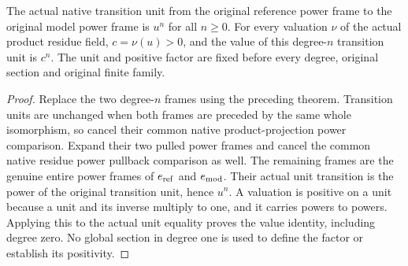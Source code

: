 \begin{theorem}\label{thm:native-tc-frame-transition-unit-powers}
\leanok
{}
The actual native transition unit from the original reference
power frame to the original model power frame is $u^n$ for all
$n\geq0$. For every valuation $\nu$ of the actual product residue
field, $c=\nu(u)>0$, and the value of this degree-$n$ transition
unit is $c^n$. The unit and positive factor are fixed before
every degree, original section and original finite family.
\end{theorem}
\begin{proof}
Replace the two degree-$n$ frames using the preceding theorem.
Transition units are unchanged when both frames are preceded
by the same whole isomorphism, so cancel their common native
product-projection power comparison. Expand their two pulled
power frames and cancel the common native residue power pullback
comparison as well. The remaining frames are the genuine entire
power frames of $e_{\rm ref}$ and $e_{\rm mod}$. Their actual unit
transition is the power of the original transition unit, hence
$u^n$. A valuation is positive on a unit because a unit and its
inverse multiply to one, and it carries powers to powers.
Applying this to the actual unit equality proves the value
identity, including degree zero. No global section in degree one
is used to define the factor or establish its positivity.
\end{proof}
